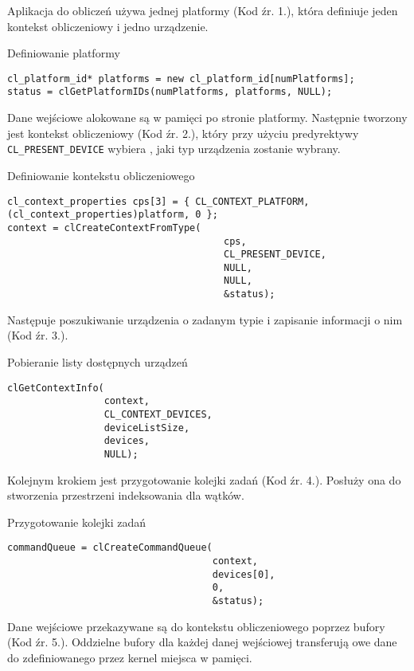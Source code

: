 Aplikacja do obliczeń używa jednej platformy (Kod źr. 1.), która definiuje jeden kontekst obliczeniowy i jedno urządzenie.
\begin{program}
\caption{Definiowanie platformy}
\begin{lstlisting}
cl_platform_id* platforms = new cl_platform_id[numPlatforms];
status = clGetPlatformIDs(numPlatforms, platforms, NULL);
\end{lstlisting}
\end{program}
Dane wejściowe alokowane są w pamięci po stronie platformy. Następnie tworzony jest kontekst obliczeniowy (Kod źr. 2.), który przy użyciu predyrektywy \verb|CL_PRESENT_DEVICE| wybiera , jaki typ urządzenia zostanie wybrany.
\begin{program}
\caption{Definiowanie kontekstu obliczeniowego}
\begin{lstlisting}
cl_context_properties cps[3] = { CL_CONTEXT_PLATFORM, (cl_context_properties)platform, 0 };
context = clCreateContextFromType(
                                      cps, 
                                      CL_PRESENT_DEVICE, 
                                      NULL, 
                                      NULL, 
                                      &status);
\end{lstlisting}
\end{program}
Następuje poszukiwanie urządzenia o zadanym typie i zapisanie informacji o nim (Kod źr. 3.).
\begin{program}
\caption{Pobieranie listy dostępnych urządzeń}
\begin{lstlisting}
clGetContextInfo(
                 context, 
                 CL_CONTEXT_DEVICES, 
                 deviceListSize, 
                 devices, 
                 NULL);

\end{lstlisting}
\end{program}
Kolejnym krokiem jest przygotowanie kolejki zadań (Kod źr. 4.). Posłuży ona do stworzenia przestrzeni indeksowania dla wątków.
\begin{program}
\caption{Przygotowanie kolejki zadań}
\begin{lstlisting}
commandQueue = clCreateCommandQueue(
                                    context, 
                                    devices[0], 
                                    0, 
                                    &status);
\end{lstlisting}
\end{program}
Dane wejściowe przekazywane są do kontekstu obliczeniowego poprzez bufory (Kod źr. 5.). Oddzielne bufory dla każdej danej wejściowej transferują owe  dane do zdefiniowanego przez kernel miejsca w pamięci. 

